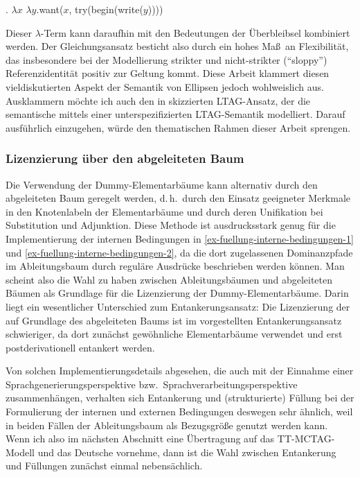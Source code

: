 \ex. \label{ex-fuellung-4}$\lambda x$ $\lambda y$.{\sc want($x$, try(begin(write($y$))))}   

Dieser $\lambda$-Term kann daraufhin mit den Bedeutungen der Überbleibsel kombiniert werden. Der Gleichungsansatz besticht also durch ein hohes Ma\ss\ an Flexibilität, das insbesondere bei der Modellierung strikter und nicht-strikter ("`sloppy"') Referenzidentität positiv zur Geltung kommt. Diese Arbeit klammert diesen vieldiskutierten Aspekt der Semantik von Ellipsen jedoch wohlweislich aus. Ausklammern möchte ich auch den in \cite{Babko-Malaya:06} skizzierten LTAG-Ansatz, der die semantische  mittels einer unterspezifizierten LTAG-Semantik modelliert. Darauf ausführlich einzugehen, würde den thematischen Rahmen dieser Arbeit sprengen.

\subsubsection*{Lizenzierung über den abgeleiteten Baum}

Die Verwendung der Dummy-Elementarbäume kann alternativ durch den abgeleiteten Baum geregelt werden, d.\,h.\ durch den Einsatz geeigneter Merkmale in den Knotenlabeln der Elementarbäume und durch deren Unifikation bei Substitution und Adjunktion. Diese Methode ist ausdrucksstark genug für die Implementierung der internen Bedingungen in \ref{ex-fuellung-interne-bedingungen-1} und \ref{ex-fuellung-interne-bedingungen-2}, da die dort zugelassenen Dominanzpfade im Ableitungsbaum durch reguläre Ausdrücke beschrieben werden können. 
Man scheint also die Wahl zu haben zwischen Ableitungsbäumen und abgeleiteten Bäumen als Grundlage für die Lizenzierung der Dummy-Elementarbäume. Darin liegt ein wesentlicher Unterschied zum Entankerungsansatz: Die Lizenzierung der  auf Grundlage des abgeleiteten Baums ist im vorgestellten Entankerungsansatz schwieriger, da dort zunächst gewöhnliche Elementarbäume verwendet und erst postderivationell entankert werden.

Von solchen Implementierungsdetails abgesehen, die auch mit der Einnahme einer Sprachgenerierungsperspektive bzw.\ Sprachverarbeitungsperspektive zusammenhängen, verhalten sich Entankerung und (strukturierte) Füllung bei der Formulierung der internen und externen Bedingungen deswegen sehr ähnlich, weil in beiden Fällen der Ableitungsbaum als Bezugsgrö\ss e genutzt werden kann. Wenn ich also im nächsten Abschnitt eine Übertragung auf das TT-MCTAG-Modell und das Deutsche vornehme, dann ist die Wahl zwischen Entankerung und Füllungen zunächst einmal nebensächlich.     



